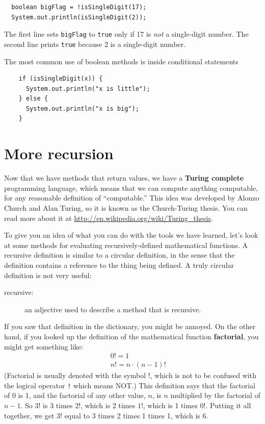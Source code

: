 \documentclass[12pt]{book}
\theoremstyle{exercise}
\begin{document}
\begin{lstlisting}
  boolean bigFlag = !isSingleDigit(17);
  System.out.println(isSingleDigit(2));
\end{lstlisting}
%
The first line sets {\tt bigFlag} to {\tt true}
only if 17 is {\em not} a single-digit number.  The second
line prints {\tt true} because 2 is a single-digit number.

The most common use of boolean methods is inside conditional
statements

\begin{lstlisting}
    if (isSingleDigit(x)) {
      System.out.println("x is little");
    } else {
      System.out.println("x is big");
    }
\end{lstlisting}


\section {More recursion}
\label{factorial}

Now that we have methods that return values, we have a {\bf Turing
  complete} programming language, which means that we can compute
anything computable, for any reasonable definition of ``computable.''
%
This idea was developed by Alonzo Church and Alan Turing, so it is
known as the Church-Turing thesis.  You can read more about it at
\url{http://en.wikipedia.org/wiki/Turing_thesis}.

To give you an idea of what you can do with the tools we have learned,
let's look at some methods for evaluating recursively-defined
mathematical functions.  A recursive definition is similar to a
circular definition, in the sense that the definition contains a
reference to the thing being defined.  A truly circular definition is
not very useful:

\begin{description}

\item[recursive:] an adjective used to describe a method that is recursive.

\end{description}

If you saw that definition in the dictionary, you might be
annoyed.  On the other hand, if you looked up the definition
of the mathematical function {\bf factorial}, you might
get something like:
%
\begin{eqnarray*}
&&  0! = 1 \\
&&  n! = n \cdot(n-1)!
\end{eqnarray*}
%
(Factorial is usually denoted with the symbol $!$, which is
not to be confused with the logical operator {\tt !} which
means NOT.)  This definition says that the factorial of 0 is 1,
and the factorial of any other value, $n$, is $n$ multiplied
by the factorial of $n-1$.  So $3!$ is 3 times $2!$, which is 2 times
$1!$, which is 1 times $0!$.  Putting it all together, we get
$3!$ equal to 3 times 2 times 1 times 1, which is 6.
\end{document}

